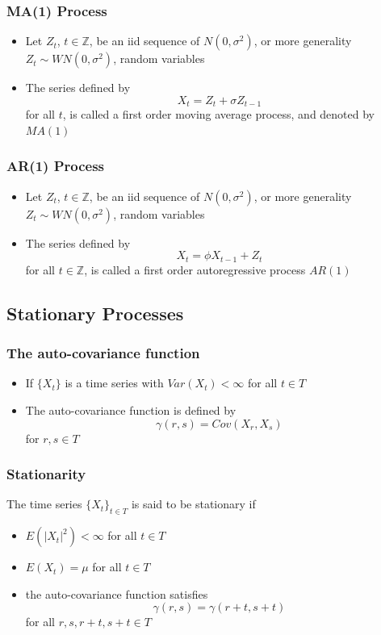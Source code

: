 \documentclass[11pt]{article}
\newcommand{\Z}{{\mathbb{Z}}}
\begin{document}
\subsubsection{MA(1) Process}
\begin{itemize}
    \item Let $Z_t$, $t\in\Z$, be an iid sequence of $N(0,\sigma^2)$, or more generality $Z_t\sim WN(0,\sigma^2)$, random variables 
    \item The series defined by \[X_t=Z_t+\sigma Z_{t-1}\]    for all $t$, is called a first order moving average process, and denoted by $MA(1)$
\end{itemize}
\subsubsection{AR(1) Process}
\begin{itemize}
    \item Let $Z_t$, $t\in\Z$, be an iid sequence of $N(0,\sigma^2)$, or more generality $Z_t\sim WN(0,\sigma^2)$, random variables 
    \item The series defined by \[X_t=\phi X_{t-1}+Z_t\]   for all $t\in\Z$, is called a first order autoregressive process $AR(1)$
\end{itemize}
\subsection{Stationary Processes}
\subsubsection{The auto-covariance function}
\begin{itemize}
    \item If $\{X_t\}$ is a time series with $Var(X_t)<\infty$ for all $t\in T$ 
    \item The auto-covariance function is defined by \[\gamma(r,s) = Cov(X_r,X_s)\] for $r,s\in T$
\end{itemize}
\subsubsection{Stationarity}
The time series $\{X_t\}_{t\in T}$ is said to be stationary if 
\begin{itemize}
    \item $E(|X_t|^2)<\infty$ for all $t\in T$
    \item $E(X_t)=\mu$ for all $t\in T$
    \item the auto-covariance function satisfies \[\gamma(r,s)=\gamma(r+t,s+t)\] for all $r,s,r+t,s+t\in T$
\end{itemize}
\end{document}
